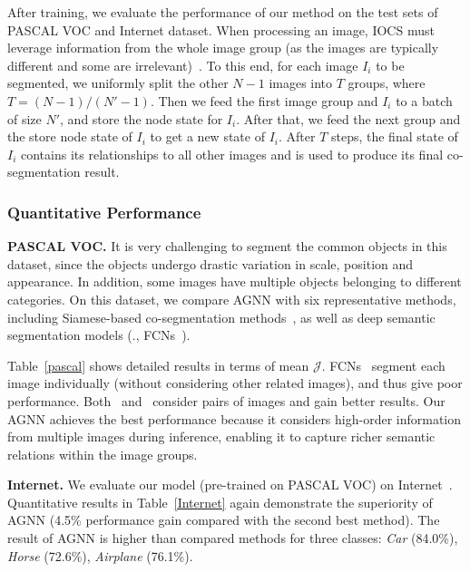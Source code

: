 \documentclass[10pt,twocolumn,letterpaper]{article}
\begin{document}
After training, we evaluate the performance of our method on the test sets of PASCAL VOC and Internet dataset. When processing an image, IOCS must leverage information from the whole image group (as the images are typically different and some are irrelevant)~\cite{quan2016object,vicente2011object}. To this end, for each image $I_i$ to be segmented, we uniformly split the other $N\!-\!1$ images into $T$ groups, where $T\!=\!(N-1)/(N'-1)$. Then we feed the first image group and $I_i$ to a batch of size $N'$, and store the node state for $I_i$. After that, we feed the next group and the store node state of $I_i$ to get a new state of $I_i$. After $T$ steps, the final state of $I_i$ contains its relationships to all other images and is used to produce its final co-segmentation result.

\vspace*{-12pt}
\subsubsection{Quantitative Performance}\label{sec:exqIOCS}
\vspace*{-4pt}
\noindent\textbf{PASCAL VOC.}  It is very challenging to segment the common objects in this dataset, since the objects undergo drastic variation  in scale,  position and appearance. In addition, some images have multiple objects belonging to different categories.  On this dataset, we compare AGNN with six representative methods, including Siamese-based co-segmentation methods~\cite{chen2018semantic,DBLP:journals/corr/abs-1804-06423}, as well as deep semantic segmentation models (\eg., FCNs~\cite{long2015fully}).

Table~\ref{pascal} shows detailed results in terms of mean $\mathcal{J}$. FCNs~\cite{long2015fully} segment each image individually (without considering other related images), and thus give poor performance.  Both~\cite{chen2018semantic} and~\cite{DBLP:journals/corr/abs-1804-06423} consider pairs of images and gain better results. Our AGNN achieves the best performance because it considers high-order information from multiple images during inference, enabling it to capture richer semantic relations within the image groups.

\noindent\textbf{Internet.}  We evaluate our model (pre-trained on PASCAL VOC) on Internet~\cite{chen2018semantic,quan2016object}.
Quantitative results in Table~\ref{Internet}  again demonstrate the superiority of AGNN (4.5\% performance gain compared with the second best method). The result of AGNN is higher than compared methods for  three  classes: \textit{Car} (84.0\%), \textit{Horse} (72.6\%), \textit{Airplane} (76.1\%). \vspace*{-12pt}
\end{document}
